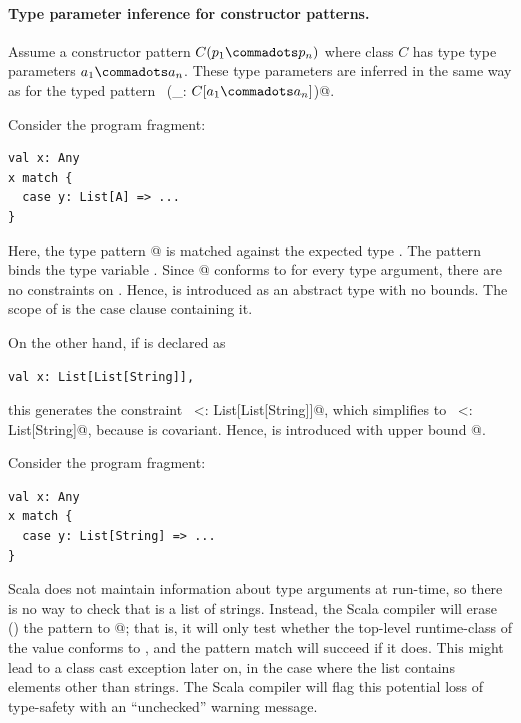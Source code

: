 \paragraph{Type parameter inference for constructor patterns.}
Assume a constructor pattern $C(p_1 \commadots p_n)$ where class $C$
has type type parameters $a_1 \commadots a_n$.  These type parameters
are inferred in the same way as for the typed pattern
~\lstinline@(_: $C[a_1 \commadots a_n]$)@.

\example
Consider the program fragment:
\begin{lstlisting}
val x: Any
x match {
  case y: List[A] => ...
}
\end{lstlisting}
Here, the type pattern \lstinline@List[a]@ is matched against the
expected type \lstinline@Any@. The pattern binds the type variable
\lstinline@a@.  Since \lstinline@List[a]@ conforms to \lstinline@Any@
for every type argument, there are no constraints on \lstinline@a@.
Hence, \lstinline@a@ is introduced as an abstract type with no
bounds. The scope of \lstinline@a@ is the case clause containing it.

On the other hand, if \lstinline@x@ is declared as
\begin{lstlisting}
val x: List[List[String]],
\end{lstlisting}
this generates the constraint 
~\lstinline@List[a] <: List[List[String]]@, which simplifies to 
~\lstinline@a <: List[String]@, because \lstinline@List@ is covariant. Hence,
\lstinline@a@ is introduced with upper bound
\lstinline@List[String]@.

\example
Consider the program fragment: 
\begin{lstlisting}
val x: Any
x match {
  case y: List[String] => ...
}
\end{lstlisting}
Scala does not maintain information about type arguments at run-time,
so there is no way to check that \lstinline@x@ is a list of strings.
Instead, the Scala compiler will erase () the
pattern to \lstinline@List[_]@; that is, it will only test whether the
top-level runtime-class of the value \lstinline@x@ conforms to
\lstinline@List@, and the pattern match will succeed if it does.  This
might lead to a class cast exception later on, in the case where the
list \lstinline@x@ contains elements other than strings.  The Scala
compiler will flag this potential loss of type-safety with an
``unchecked'' warning message.

